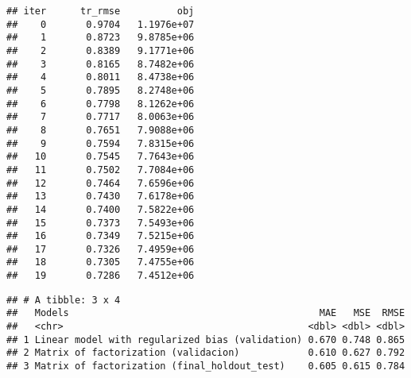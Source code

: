 \documentclass[
]{article}
\newenvironment{Shaded}{\begin{snugshade}}{\end{snugshade}}
\newcommand{\AttributeTok}[1]{\textcolor[rgb]{0.13,0.29,0.53}{#1}}
\newcommand{\CommentTok}[1]{\textcolor[rgb]{0.56,0.35,0.01}{\textit{#1}}}
\newcommand{\FunctionTok}[1]{\textcolor[rgb]{0.13,0.29,0.53}{\textbf{#1}}}
\newcommand{\NormalTok}[1]{#1}
\newcommand{\OtherTok}[1]{\textcolor[rgb]{0.56,0.35,0.01}{#1}}
\newcommand{\SpecialCharTok}[1]{\textcolor[rgb]{0.81,0.36,0.00}{\textbf{#1}}}
\newcommand{\StringTok}[1]{\textcolor[rgb]{0.31,0.60,0.02}{#1}}
\begin{document}
\begin{verbatim}
## iter      tr_rmse          obj
##    0       0.9704   1.1976e+07
##    1       0.8723   9.8785e+06
##    2       0.8389   9.1771e+06
##    3       0.8165   8.7482e+06
##    4       0.8011   8.4738e+06
##    5       0.7895   8.2748e+06
##    6       0.7798   8.1262e+06
##    7       0.7717   8.0063e+06
##    8       0.7651   7.9088e+06
##    9       0.7594   7.8315e+06
##   10       0.7545   7.7643e+06
##   11       0.7502   7.7084e+06
##   12       0.7464   7.6596e+06
##   13       0.7430   7.6178e+06
##   14       0.7400   7.5822e+06
##   15       0.7373   7.5493e+06
##   16       0.7349   7.5215e+06
##   17       0.7326   7.4959e+06
##   18       0.7305   7.4755e+06
##   19       0.7286   7.4512e+06
\end{verbatim}

\begin{Shaded}
\end{Shaded}

\begin{verbatim}
## # A tibble: 3 x 4
##   Models                                            MAE   MSE  RMSE
##   <chr>                                           <dbl> <dbl> <dbl>
## 1 Linear model with regularized bias (validation) 0.670 0.748 0.865
## 2 Matrix of factorization (validacion)            0.610 0.627 0.792
## 3 Matrix of factorization (final_holdout_test)    0.605 0.615 0.784
\end{verbatim}
\end{document}
